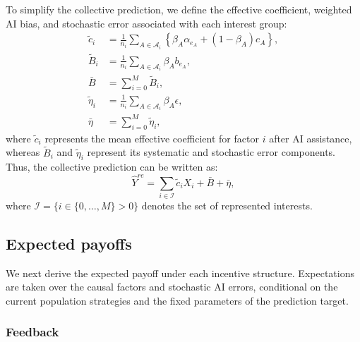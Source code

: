 \documentclass[12pt]{article}
\begin{document}
To simplify the collective prediction, we define the effective coefficient, weighted AI bias, and stochastic error associated with each interest group:
\begin{align}
\tilde{c}_i &= \frac{1}{n_i}\sum_{A \in \mathcal{A}_i}\left\{\beta_A\alpha_{e_A} + (1-\beta_A)c_A\right\},\\
\tilde{B}_i &= \frac{1}{n_i}\sum_{A \in \mathcal{A}_i}\beta_Ab_{e_A},\\
\bar{B} &= \sum_{i = 0}^{M}\tilde{B}_i,\\
\tilde{\eta}_i &= \frac{1}{n_i}\sum_{A \in \mathcal{A}_i}\beta_A\epsilon,\\
\bar{\eta} &= \sum_{i = 0}^{M}\tilde{\eta}_i,
\end{align}
where $\tilde{c}_i$ represents the mean effective coefficient for factor $i$ after AI assistance, whereas $\tilde{B}_i$ and $\tilde{\eta}_i$ represent its systematic and stochastic error components.
Thus, the collective prediction can be written as:
\begin{equation}
\hat{Y}^{re} = \sum_{i\in\mathcal I}\tilde{c}_iX_i+\bar{B}+\bar{\eta},
\end{equation}
where $\mathcal I=\{i\in\{0,\ldots,M\}>0\}$ denotes the set of represented interests.

\subsection{Expected payoffs}

We next derive the expected payoff under each incentive structure. 
Expectations are taken over the causal factors and stochastic AI errors, conditional on the current population strategies and the fixed parameters of the prediction target.

\subsubsection*{Feedback}
\end{document}
